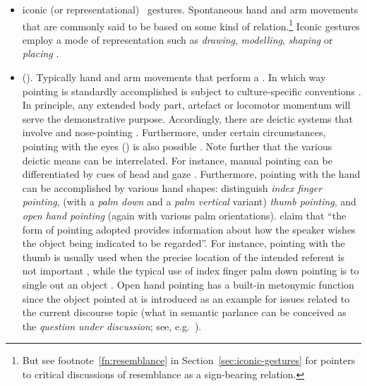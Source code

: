 \documentclass[output=paper
 	        ,biblatex
                ,babelshorthands
                ,newtxmath
                ,draftmode
                ,colorlinks, citecolor=brown
]{langscibook}
\begin{document}
\begin{itemize}
\item iconic (or representational)\  gestures. Spontaneous hand and arm movements that are commonly said to be based on some kind of  relation.\footnote{But see footnote~\ref{fn:resemblance} in Section~\ref{sec:iconic-gestures} for pointers to critical discussions of resemblance as a sign-bearing relation.} Iconic gestures employ a mode of representation such as \textit{drawing}, \textit{modelling}, \textit{shaping} or \textit{placing} \citep{Streeck:2008,Mueller:1998}.
\item {} (). Typically hand and arm movements that perform a . 
%
In which way pointing is standardly accomplished is subject to culture-specific conventions \citep{Wilkins:2003}. 
%
In principle, any extended body part, artefact or locomotor momentum will serve the demonstrative purpose. 
%
Accordingly, there are deictic systems that involve  \citep{Enfield:2001} and nose-pointing \citep{Cooperrider:Nunez:2012}. 
%
Furthermore, under certain circumstances, pointing with the eyes () is also possible \citep{Hadjikhani:Hoge:Snyder:de:Gelder:2008}. 
%
Note further that the various deictic means can be interrelated. For instance, manual pointing can be differentiated by cues of head and gaze \citep{Butterworth:Itakura:2000}.
%
Furthermore, pointing with the hand can be accomplished by various hand shapes: \citet{Kendon:Versante:2003} distinguish \emph{index finger pointing}, (with a \emph{palm down} and a \emph{palm vertical} variant) \emph{thumb pointing}, and \emph{open hand pointing} (again with various palm orientations).
%
\citet[]{Kendon:Versante:2003} claim that \enquote{the form of pointing adopted provides information about how the speaker wishes the object being indicated to be regarded}.
%
For instance, pointing with the thumb is usually used when the precise location of the intended referent is not important \citep[--125]{Kendon:Versante:2003}, while the typical use of index finger palm down pointing is to single out an object \citep[]{Kendon:Versante:2003}. 
%
Open hand pointing has a built-in metonymic function since the object pointed at is introduced as an example for issues related to the current discourse topic (what in semantic parlance can be conceived as the \emph{question under discussion}; see, e.g.\ \citealp{Ginzburg:2012}).

\end{itemize}
\end{document}
